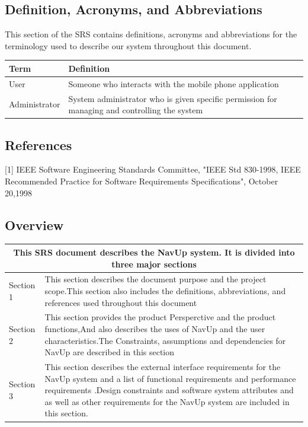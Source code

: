 \documentclass[english]{article}
\begin{document}
		\subsection{Definition, Acronyms, and Abbreviations}
				This section of the SRS contains definitions, acronyms and abbreviations for the terminology used to describe our system throughout this document.
				\begin{tabular}{ |p{3cm}|p{9cm}|  }
				\hline
				\textbf{Term} & \textbf{Definition}\\
				\hline
				User & Someone who interacts with the mobile phone application \\
				\hline
				Administrator & System administrator who is given specific permission for managing and controlling the system\\
				\hline
				\end{tabular}

		\subsection{References}
			[1] IEEE Software Engineering Standards Committee, "IEEE Std 830-1998, IEEE Recommended Practice for Software Requirements Specifications", October 20,1998

		\subsection{Overview}
				\begin{tabular}{ |p{3cm}||p{11cm}|  }
				\hline
				\multicolumn{2}{|c|}{This SRS document describes the NavUp system. It is divided into three major 							sections} \\
				\hline
				Section 1 & This section describes the document purpose and the project scope.This section also includes 						the definitions, abbreviations, and references used throughout this document \\
				\hline
				Section 2 & This section provides the product Persperctive and the product functions,And also describes 						the uses of NavUp and the user characteristics.The Constraints, assumptions and dependencies for NavUp					are described in this section\\
				\hline
				Section 3 & This section describes the external interface requirements for the NavUp system and a list of functional requirements and performance requirements .Design constraints and software system attributes and as well as other requirements for the NavUp system are included in this section.\\
				\hline
				\end{tabular}
\end{document}

